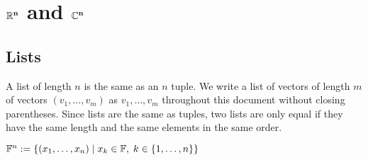 \section{\texorpdfstring{$\mathbf{\mathbb{R}^n}$}{R^n} and \texorpdfstring{$\mathbf{\mathbb{C}^n}$}{C^n}}

\subsection{Lists}
\setcounter{thm}{7}
\begin{mydef} 
  A list of length $n$ is the same as an $n$ tuple. We write a list of vectors of length $m$ of vectors $(v_1, \ldots, v_m)$ as $v_1, \ldots, v_m$ throughout this document without closing parentheses.
  Since lists are the same as tuples, two lists are only equal if they have the same length and the same elements in the same order.
\end{mydef}

\setcounter{thm}{10}
\begin{mydef} 
  $\mathbb{F}^n := \left \{ (x_1, \dots, x_n) \mid x_k \in \mathbb{F}, \; k \in \{1, \dots, n\} \right \}$
\end{mydef}
